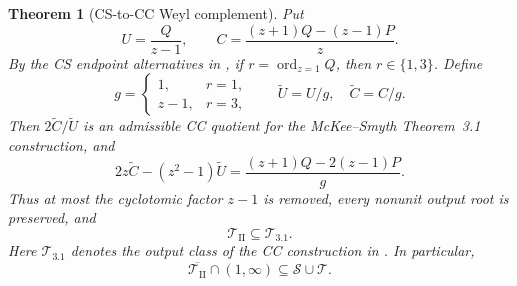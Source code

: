 \documentclass[11pt,reqno]{amsart}
\newtheorem{theorem}{Theorem}[section]
\theoremstyle{definition}
\theoremstyle{remark}
\DeclareMathOperator{\ord}{ord}
\newcommand{\calS}{\mathcal S}
\newcommand{\calT}{\mathcal T}
\begin{document}
\begin{theorem}[CS-to-CC Weyl complement]\label{thm:typeII}
Put
\begin{equation}\label{eq:UC}
 U=\frac{Q}{z-1},\qquad
 C=\frac{(z+1)Q-(z-1)P}{z}.
\end{equation}
By the CS endpoint alternatives in \cite[Sec.~2.3]{mckeesmyth}, if
$r=\ord_{z=1}Q$, then $r\in\{1,3\}$.  Define
\[
 g=\begin{cases}1,&r=1,\\z-1,&r=3,\end{cases}\qquad
 \widetilde U=U/g,\quad \widetilde C=C/g.
\]
Then $2\widetilde C/\widetilde U$ is an admissible CC quotient for the
McKee--Smyth Theorem~3.1 construction, and
\begin{equation}\label{eq:typeIIidentity}
 2z\widetilde C-(z^2-1)\widetilde U
 =\frac{(z+1)Q-2(z-1)P}{g}.
\end{equation}
Thus at most the cyclotomic factor $z-1$ is removed, every nonunit output root
is preserved, and
\[
 \calT_{\mathrm{II}}\subseteq\calT_{3.1}.
\]
Here $\calT_{3.1}$ denotes the output class of the CC construction in
\cite[Thm.~3.1]{mckeesmyth}.
In particular,
\begin{equation}\label{eq:typeIIclosure}
 \overline{\calT_{\mathrm{II}}}\cap(1,\infty)
 \subseteq\calS\cup\calT.
\end{equation}
\end{theorem}
\end{document}
